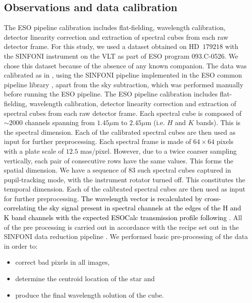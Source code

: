 \documentclass{aa}
\newcommand{\newchange}[1]{\textcolor{black}{#1}}
\begin{document}
\subsection{Observations and data calibration}\label{sec:datadesc}
The ESO pipeline calibration includes flat-fielding, wavelength calibration, detector linearity correction and extraction of spectral cubes from each raw detector frame. 
For this study, we used a dataset obtained on HD~$179218$ with the SINFONI instrument on the VLT \citep{2004SINFONI,2003SEisenhauer} as part of ESO program 093.C-0526.
We chose this dataset because of the absence of any known companion.
The data was calibrated as in \citet{2018A&ChristiaensHD142527}, using the SINFONI pipeline implemented in the ESO common pipeline library \citep[EsoRex version 3.10.2;][]{2006Abuter}, apart from the sky subtraction, which was performed manually before running the ESO pipeline.
The ESO pipeline calibration includes flat-fielding, wavelength calibration, detector linearity correction and extraction of spectral cubes from each raw detector frame. 
Each spectral cube is composed of $\sim 2000$ channels spanning from $1.45\mu$m to $2.45 \mu$m (i.e. $H$ and $K$ bands).
This is the spectral dimension.
Each of the calibrated spectral cubes are then used as input for further preprocessing.
Each spectral frame is made of $64\times64$ pixels with a plate scale of $12.5$ mas/pixel. However, due to a twice coarser sampling vertically, each pair of consecutive rows have the same values.
This forms the spatial dimension.
We have a sequence of $83$ such spectral cubes captured in pupil-tracking mode, with the instrument rotator turned off.
This constitutes the temporal dimension.
Each of the calibrated spectral cubes are then used as input for further preprocessing.
\newchange{The wavelength vector is recalculated by cross-correlating the sky signal present in spectral channels at the edges of the H and K band channels with the expected ESOCalc transmission profile following \cite{2018AHoeijmakersMM}. }
All of the pre processing is carried out in accordance with the recipe set out in the SINFONI data reduction pipeline \citep{2006Abuter}.
We performed basic pre-processing of the data in order to:
\begin{itemize}
    \item correct bad pixels in all images,
    \item determine the centroid location of the star and
    \item produce the final wavelength solution of the cube. 
\end{itemize}
\end{document}
